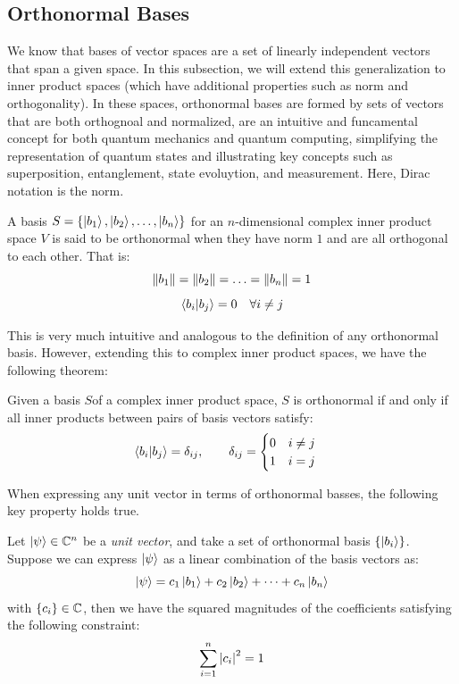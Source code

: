 \documentclass[12pt]{article}
\begin{document}
\subsection{Orthonormal Bases}

We know that bases of vector spaces are a set of linearly independent vectors that span a given space. In this subsection, we will extend this generalization to inner product spaces (which have additional properties such as norm and orthogonality). In these spaces, orthonormal bases are formed by sets of vectors that are both orthognoal and normalized, are an intuitive and funcamental concept for both quantum mechanics and quantum computing, simplifying the representation of quantum states and illustrating key concepts such as superposition, entanglement, state evoluytion, and measurement. Here, Dirac notation is the norm. 

\begin{definition}
    A basis $S = \left\{\ket{b_1}, \ket{b_2}, \ldots, \ket{b_n}\right\}$ for an $n$-dimensional complex inner product space $V$ is said to be orthonormal when they have norm $1$ and are all orthogonal to each other. That is:
    $$\norm{b_1} = \norm{b_2} = \ldots = \norm{b_n} = 1$$
    $$\braket{b_i}{b_j} = 0 \quad \forall i \neq j$$
\end{definition}

This is very much intuitive and analogous to the definition of any orthonormal basis. However, extending this to complex inner product spaces, we have the following theorem:

\begin{theorem}
    Given a basis $S$of a complex inner product space, $S$ is orthonormal if and only if all inner products between pairs of basis vectors satisfy:
    $$
    \braket{b_i}{b_j} = \delta_{ij}, \qquad \delta_{ij} = \begin{cases}
        0 \quad i \neq j \\
        1 \quad i = j
    \end{cases}
    $$
\end{theorem}

When expressing any unit vector in terms of orthonormal basses, the following key property holds true.

\begin{theorem}
    Let $\ket{\psi} \in \mathbb{C}^n$ be a \textit{unit vector}, and take a set of orthonormal basis $\left\{\ket{b_i}\right\}$. Suppose we can express $\ket{\psi}$ as a linear combination of the basis vectors as:
    $$\ket{\psi} = c_1 \ket{b_1} + c_2 \ket{b_2} + \cdots + c_n \ket{b_n}$$
    with $\left\{c_i\right\} \in \mathbb{C}$, then we have the squared magnitudes of the coefficients satisfying the following constraint:
    $$\sum_{i=1}^{n} \abs{c_i}^2 = 1$$ 
\end{theorem}
\end{document}
